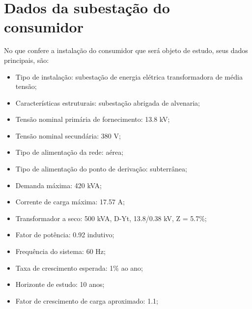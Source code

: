 \section{Dados da subestação do consumidor}

No que confere a instalação do consumidor que será objeto de estudo, seus dados principais, são:

\begin{itemize}
    \item Tipo de instalação: subestação de energia elétrica transformadora de média tensão;
    \item Características estruturais: subestação abrigada de alvenaria;
    \item Tensão nominal primária de fornecimento: 13.8 kV;
    \item Tensão nominal secundária: 380 V;
    \item Tipo de alimentação da rede: aérea;
    \item Tipo de alimentação do ponto de derivação: subterrânea;
    \item Demanda máxima: 420 kVA;
    \item Corrente de carga máxima: 17.57 A;
    \item Transformador a seco: 500 kVA, D-Yt, 13.8/0.38 kV, Z = 5.7\%;
    \item Fator de potência: 0.92 indutivo;
    \item Frequência do sistema: 60 Hz;
    \item Taxa de crescimento esperada: 1\% ao ano;
    \item Horizonte de estudo: 10 anos;
    \item Fator de crescimento de carga aproximado: 1.1;
\end{itemize}
